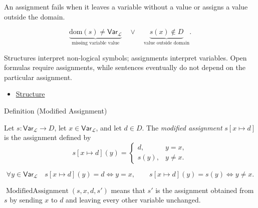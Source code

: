 \begin{remark*}
An assignment fails when it leaves a variable without a value or assigns a
value outside the domain.
\end{remark*}

\begin{remark*}
\[
\underbrace{\mathrm{dom}(s)\neq\mathsf{Var}_{\mathcal L}}_{\text{missing variable value}}
\quad\lor\quad
\underbrace{s(x)\notin D}_{\text{value outside domain}}.
\]
\end{remark*}

\begin{remark*}[Interpretation]
Structures interpret non-logical symbols; assignments interpret variables.
Open formulas require assignments, while sentences eventually do not depend on
the particular assignment.
\end{remark*}

\begin{dependencies}
\begin{itemize}
  \item \hyperref[def:structure]{Structure}
\end{itemize}
\end{dependencies}

\begin{definitionbox}{Definition (Modified Assignment)}
\begin{definition}
\label{def:mod-assign}
Let \(s:\mathsf{Var}_{\mathcal L}\to D\), let \(x\in\mathsf{Var}_{\mathcal L}\),
and let \(d\in D\). The \emph{modified assignment} \(s[x\mapsto d]\) is the
assignment defined by
\[
s[x\mapsto d](y)=
\begin{cases}
d, & y=x,\\
s(y), & y\neq x.
\end{cases}
\]
\end{definition}
\end{definitionbox}

\begin{remark*}
\[
\forall y\in\mathsf{Var}_{\mathcal L}\quad
s[x\mapsto d](y)=d \Longleftrightarrow y=x,
\qquad
s[x\mapsto d](y)=s(y) \Longleftrightarrow y\neq x.
\]
\end{remark*}

\begin{remark*}
\(\operatorname{ModifiedAssignment}(s,x,d,s')\) means that \(s'\) is the
assignment obtained from \(s\) by sending \(x\) to \(d\) and leaving every
other variable unchanged.
\end{remark*}

